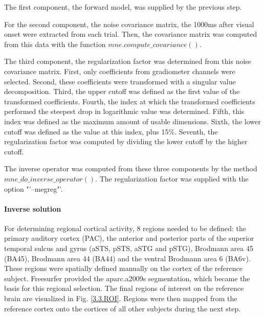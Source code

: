 The first component, the forward model, was supplied by the previous step.

For the second component, the noise covariance matrix, the 1000ms after visual onset were extracted from each trial.
Then, the covariance matrix was computed from this data with the function $mne.compute\_covariance()$.

The third component, the regularization factor was determined from this noise covariance matrix.
First, only coefficients from gradiometer channels were selected.
Second, these coefficients were transformed with a singular value decomposition.
Third, the upper cutoff was defined as the first value of the transformed coefficients.
Fourth, the index at which the transformed coefficients performed the steepest drop in logarithmic value was determined.
Fifth, this index was defined as the maximum amount of usable dimensions.
Sixth, the lower cutoff was defined as the value at this index, plus 15\%.
Seventh, the regularization factor was computed by dividing the lower cutoff by the higher cutoff.


The inverse operator was computed from these three components by the method \linebreak $mne\_do\_inverse\_operator()$. The regularization factor was supplied with the option \linebreak "'--megreg"'.

\paragraph{Inverse solution}
For determining regional cortical activity, 8 regions needed to be defined: the primary auditory cortex (PAC), the anterior and posterior parts of the superior temporal sulcus and gyrus (aSTS, pSTS, aSTG and pSTG), Brodmann area 45 (BA45), Brodmann area 44 (BA44) and the ventral Brodmann area 6 (BA6v).
These regions were spatially defined manually on the cortex of the reference subject.
Freesurfer provided the aparc.a2009s segmentation, which became the basis for this regional selection.
The final regions of interest on the reference brain are visualized in Fig. \ref{3.3.ROI}.
Regions were then mapped from the reference cortex onto the cortices of all other subjects during the next step.

